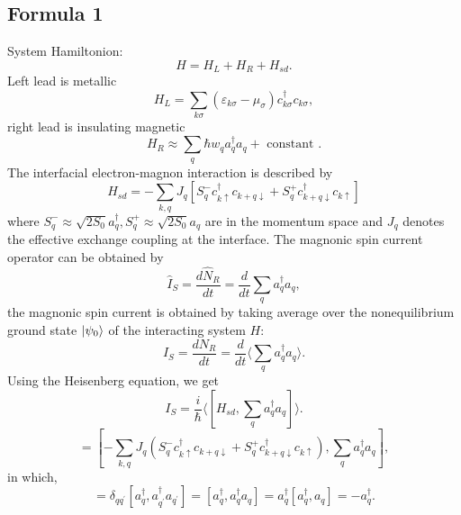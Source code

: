 \documentclass[aps,prb,superscriptaddress]{revtex4-2}
\begin{document}
\subsection{Formula 1}
System Hamiltonion:
\begin{equation}
H=H_{L}+H_{R}+H_{s d}.
\end{equation}
Left lead is metallic
\begin{equation}
H_{L} = \sum_{k\sigma} \left(\varepsilon_{k\sigma}-\mu_{\sigma}\right) c_{k \sigma}^{\dagger} c_{k \sigma},
\end{equation}
right lead is insulating magnetic
\begin{equation}
H_{R} \approx \sum_{q} \hbar w_{q} a_{q}^{\dagger} a_{q}+\text { constant }.
\end{equation}
The interfacial electron-magnon interaction is described by
\begin{equation}
H_{s d}=-\sum_{k, q} J_{q}\left[S_{q}^{-} c_{k \uparrow}^{\dagger} c_{k+q \downarrow}+S_{q}^{+} c_{k+q \downarrow}^{\dagger} c_{k \uparrow}\right]
\end{equation}
where $S_{q}^{-} \approx \sqrt{2 S_{0}} a_{q}^{\dagger}, S_{q}^{+} \approx \sqrt{2 S_{0}} a_{q}$ are in the momentum space and $J_{q}$ denotes the effective exchange coupling at the interface. The magnonic spin current operator can be obtained by
\begin{equation}
\hat{I}_{S} = \frac{d\hat{N}_{R}}{dt} =  \frac{d}{dt} \sum_{q}a_{q}^{\dag}a_{q},
\end{equation}
the magnonic spin current is obtained by taking average over the nonequilibrium ground state $\ket{\psi_{0}}$ of the interacting system $H$:
\begin{equation}
I_{S} = \frac{dN_{R}}{dt} =  \frac{d}{dt} \langle \sum_{q}a_{q}^{\dag}a_{q}\rangle.
\end{equation}
Using the Heisenberg equation, we get
\begin{equation}
I_{S}=\frac{i}{\hbar}\langle[H_{s d}, \sum_{q} a_{q}^{\dagger} a_{q}]\rangle.
\end{equation}
\begin{equation}
[H_{s d}, \sum_{q} a_{q}^{\dagger} a_{q}] = [-\sum_{k, q} J_{q}\left(S_{q}^{-} c_{k \uparrow}^{\dagger} c_{k+q \downarrow}+S_{q}^{+} c_{k+q \downarrow}^{\dagger} c_{k \uparrow}\right), \sum_{q} a_{q}^{\dagger} a_{q}],
\end{equation}
in which,
\begin{equation}
[a_{q}^{\dag}, \sum_{q^{\prime}} a_{q'}^{\dagger} a_{q^{\prime}}] = \delta_{q q^{\prime}}[a_{q}^{\dagger}, a_{q^{\prime}}^{\dagger} a_{q^{\prime}}] = [a_{q}^{\dagger}, a_{q}^{\dagger} a_{q}] = a_{q}^{\dagger}[a_{q}^{\dagger}, a_{q}] = - a_{q}^{\dagger}.
\end{equation}
\end{document}
